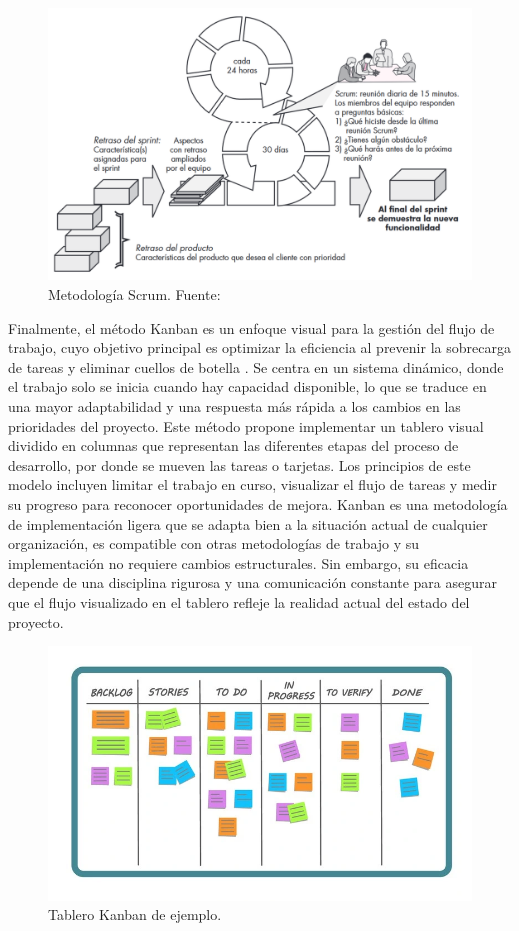 \begin{figure}[!htb]
    \centering
    \includegraphics[width=\linewidth]{Figures/model-scrum.png}
    \caption{Metodología Scrum. Fuente: \cite{pressman2010ingenieria}}
\end{figure}

Finalmente, el método Kanban es un enfoque visual para la gestión del flujo de trabajo, cuyo objetivo principal es optimizar la eficiencia al prevenir la sobrecarga de tareas y eliminar cuellos de botella \cite{alaidaros2021kanban}. Se centra en un sistema dinámico, donde el trabajo solo se inicia cuando hay capacidad disponible, lo que se traduce en una mayor adaptabilidad y una respuesta más rápida a los cambios en las prioridades del proyecto. Este método propone implementar un tablero visual dividido en columnas que representan las diferentes etapas del proceso de desarrollo, por donde se mueven las tareas o tarjetas. Los principios de este modelo incluyen limitar el trabajo en curso, visualizar el flujo de tareas y medir su progreso para reconocer oportunidades de mejora. Kanban es una metodología de implementación ligera que se adapta bien a la situación actual de cualquier organización, es compatible con otras metodologías de trabajo y su implementación no requiere cambios estructurales. Sin embargo, su eficacia depende de una disciplina rigurosa y una comunicación constante para asegurar que el flujo visualizado en el tablero refleje la realidad actual del estado del proyecto.

\begin{figure}[!htb]
    \centering
    \includegraphics[width=\linewidth]{Figures/model-kanban.png}
    \caption{Tablero Kanban de ejemplo.}
\end{figure}

